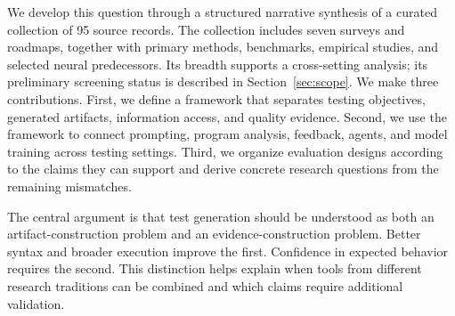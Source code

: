 We develop this question through a structured narrative synthesis of a curated collection of 95 source records. The collection includes seven surveys and roadmaps, together with primary methods, benchmarks, empirical studies, and selected neural predecessors. Its breadth supports a cross-setting analysis; its preliminary screening status is described in Section~\ref{sec:scope}. We make three contributions. First, we define a framework that separates testing objectives, generated artifacts, information access, and quality evidence. Second, we use the framework to connect prompting, program analysis, feedback, agents, and model training across testing settings. Third, we organize evaluation designs according to the claims they can support and derive concrete research questions from the remaining mismatches.

The central argument is that test generation should be understood as both an artifact-construction problem and an evidence-construction problem. Better syntax and broader execution improve the first. Confidence in expected behavior requires the second. This distinction helps explain when tools from different research traditions can be combined and which claims require additional validation.
